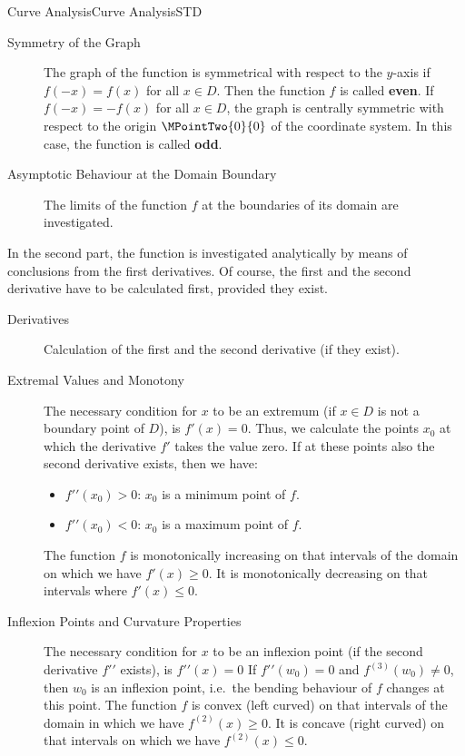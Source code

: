 \begin{MXContent}{Curve Analysis}{Curve Analysis}{STD}
\begin{description}
\item[Symmetry of the Graph]
The graph of the function is symmetrical with respect to the $y$-axis if $f(-x) = f(x)$ for all
$x \in D$. Then the function $f$ is called \textbf{even}. If $f(-x) = -f(x)$
for all $x \in D$, the graph is centrally symmetric with respect to the origin 
$\MPointTwo{0}{0}$ of the coordinate system. In this case, the function 
is called \textbf{odd}.


\item[Asymptotic Behaviour at the Domain Boundary]
The limits of the function $f$ at the boundaries of its domain are investigated.
\end{description} 

In the second part, the function is investigated analytically by means of conclusions 
from the first derivatives. Of course, the first and the second derivative have to be 
calculated first, provided they exist.
\begin{description}
\item[Derivatives]

Calculation of the first and the second derivative (if they exist).

\item[Extremal Values and Monotony]

The necessary condition for $x$ to be an extremum (if $x \in D$ is not a boundary point of $D$), is $f'(x) = 0$.\newline
Thus, we calculate the points $x_0$ at which the derivative $f'$ takes the value zero. If at these points also 
the second derivative exists, then we have:
\begin{itemize}
 \item ${f'}'(x_0) > 0$: $x_0$ is a minimum point of $f$.
 \item ${f'}'(x_0) < 0$: $x_0$ is a maximum point of $f$.
\end{itemize}
The function $f$ is monotonically increasing on that intervals of the domain 
on which we have $f'(x) \geq 0$. It is monotonically decreasing on that intervals
where $f'(x) \leq 0$.

\item[Inflexion Points and Curvature Properties]
The necessary condition for $x$ to be an inflexion point (if the second derivative ${f'}'$ exists), is ${f'}'(x) = 0$\newline
If ${f'}'(w_0) = 0$ and $f^{(3)}(w_0) \neq 0$, then $w_0$ is an inflexion point, i.e.\ the bending behaviour of $f$ changes at this 
point.\newline
The function $f$ is convex (left curved) on that intervals of the domain in which we have $f^{(2)}(x) \geq 0$. It is 
concave (right curved) on that intervals on which we have $f^{(2)}(x) \leq 0$.



\end{description}
\end{MXContent}
